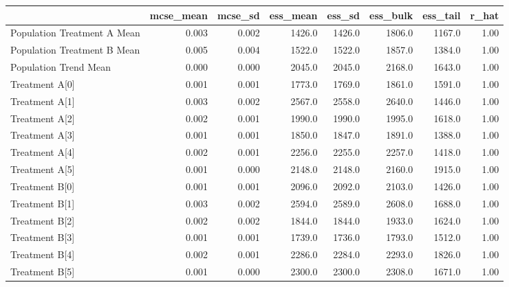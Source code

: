 \begin{tabular}{lrrrrrrr}
\toprule
{} &  mcse\_mean &  mcse\_sd &  ess\_mean &  ess\_sd &  ess\_bulk &  ess\_tail &  r\_hat \\
\midrule
Population Treatment A Mean           &      0.003 &    0.002 &    1426.0 &  1426.0 &    1806.0 &    1167.0 &   1.00 \\
Population Treatment B Mean           &      0.005 &    0.004 &    1522.0 &  1522.0 &    1857.0 &    1384.0 &   1.00 \\
Population Trend Mean                 &      0.000 &    0.000 &    2045.0 &  2045.0 &    2168.0 &    1643.0 &   1.00 \\
Treatment A[0]                        &      0.001 &    0.001 &    1773.0 &  1769.0 &    1861.0 &    1591.0 &   1.00 \\
Treatment A[1]                        &      0.003 &    0.002 &    2567.0 &  2558.0 &    2640.0 &    1446.0 &   1.00 \\
Treatment A[2]                        &      0.002 &    0.001 &    1990.0 &  1990.0 &    1995.0 &    1618.0 &   1.00 \\
Treatment A[3]                        &      0.001 &    0.001 &    1850.0 &  1847.0 &    1891.0 &    1388.0 &   1.00 \\
Treatment A[4]                        &      0.002 &    0.001 &    2256.0 &  2255.0 &    2257.0 &    1418.0 &   1.00 \\
Treatment A[5]                        &      0.001 &    0.000 &    2148.0 &  2148.0 &    2160.0 &    1915.0 &   1.00 \\
Treatment B[0]                        &      0.001 &    0.001 &    2096.0 &  2092.0 &    2103.0 &    1426.0 &   1.00 \\
Treatment B[1]                        &      0.003 &    0.002 &    2594.0 &  2589.0 &    2608.0 &    1688.0 &   1.00 \\
Treatment B[2]                        &      0.002 &    0.002 &    1844.0 &  1844.0 &    1933.0 &    1624.0 &   1.00 \\
Treatment B[3]                        &      0.001 &    0.001 &    1739.0 &  1736.0 &    1793.0 &    1512.0 &   1.00 \\
Treatment B[4]                        &      0.002 &    0.001 &    2286.0 &  2284.0 &    2293.0 &    1826.0 &   1.00 \\
Treatment B[5]                        &      0.001 &    0.000 &    2300.0 &  2300.0 &    2308.0 &    1671.0 &   1.00 \\

\end{tabular}
